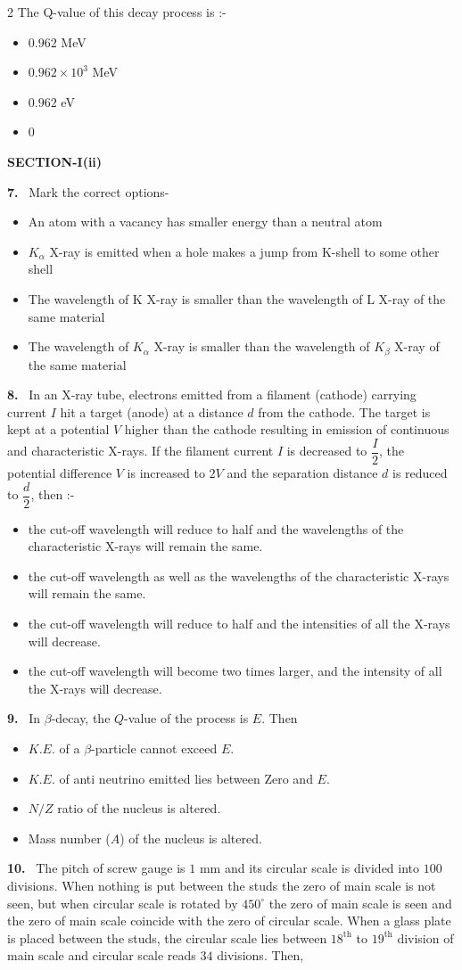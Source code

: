 \documentclass[10pt]{extarticle}
\newcommand{\sect}[1]{\par\smallskip\noindent\textbf{#1}\par}
\newcommand{\qn}[1]{\par\smallskip\noindent\textbf{#1.}~}
\newenvironment{qoptions}{\begin{itemize}[leftmargin=1.8em,itemsep=1pt,topsep=2pt,label={}]}{\end{itemize}}
\newcommand{\opt}[2]{\item[(#1)] #2}
\begin{document}
\begin{multicols}{2}
The Q-value of this decay process is :-
\begin{qoptions}
\opt{A}{$0.962$ MeV}
\opt{B}{$0.962\times10^{3}$ MeV}
\opt{C}{$0.962$ eV}
\opt{D}{$0$}
\end{qoptions}
\sect{SECTION-I(ii)}
\qn{7} Mark the correct options-
\begin{qoptions}
\opt{A}{An atom with a vacancy has smaller energy than a neutral atom}
\opt{B}{$K_\alpha$ X-ray is emitted when a hole makes a jump from K-shell to some other shell}
\opt{C}{The wavelength of K X-ray is smaller than the wavelength of L X-ray of the same material}
\opt{D}{The wavelength of $K_\alpha$ X-ray is smaller than the wavelength of $K_\beta$ X-ray of the same material}
\end{qoptions}
\qn{8} In an X-ray tube, electrons emitted from a filament (cathode) carrying current $I$ hit a target (anode) at a distance $d$ from the cathode. The target is kept at a potential $V$ higher than the cathode resulting in emission of continuous and characteristic X-rays. If the filament current $I$ is decreased to $\dfrac I2$, the potential difference $V$ is increased to $2V$ and the separation distance $d$ is reduced to $\dfrac d2$, then :-
\begin{qoptions}
\opt{A}{the cut-off wavelength will reduce to half and the wavelengths of the characteristic X-rays will remain the same.}
\opt{B}{the cut-off wavelength as well as the wavelengths of the characteristic X-rays will remain the same.}
\opt{C}{the cut-off wavelength will reduce to half and the intensities of all the X-rays will decrease.}
\opt{D}{the cut-off wavelength will become two times larger, and the intensity of all the X-rays will decrease.}
\end{qoptions}
\qn{9} In $\beta$-decay, the $Q$-value of the process is $E$. Then
\begin{qoptions}
\opt{A}{$K.E.$ of a $\beta$-particle cannot exceed $E$.}
\opt{B}{$K.E.$ of anti neutrino emitted lies between Zero and $E$.}
\opt{C}{$N/Z$ ratio of the nucleus is altered.}
\opt{D}{Mass number ($A$) of the nucleus is altered.}
\end{qoptions}
\qn{10} The pitch of screw gauge is $1$ mm and its circular scale is divided into $100$ divisions. When nothing is put between the studs the zero of main scale is not seen, but when circular scale is rotated by $450^\circ$ the zero of main scale is seen and the zero of main scale coincide with the zero of circular scale. When a glass plate is placed between the studs, the circular scale lies between $18^{\mathrm{th}}$ to $19^{\mathrm{th}}$ division of main scale and circular scale reads $34$ divisions. Then,

\end{multicols}
\end{document}
